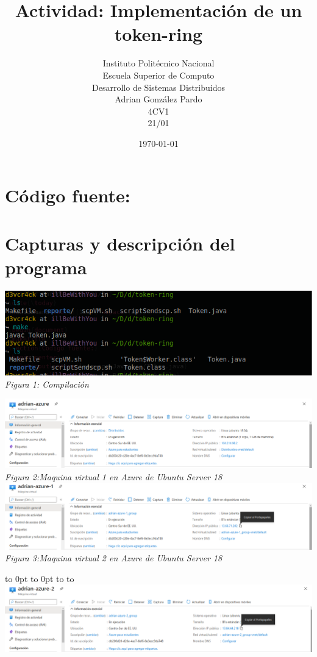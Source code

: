 \documentclass[10pt,executivepaper]{article}
\title{Actividad: Implementación de un token-ring}
\author{Instituto Politécnico Nacional\\Escuela Superior de Computo\\Desarrollo de Sistemas Distribuidos\\Adrian González Pardo\\4CV1\\21/01}
\date{\today}
\def\fillandplacepagenumber{%
 \par\pagestyle{empty}%
 \vbox to 0pt{\vss}\vfill
 \vbox to 0pt{\baselineskip0pt
   \hbox to\linewidth{\hss}%
   \baselineskip\footskip
   \hbox to\linewidth{%
     \hfil\thepage\hfil}\vss}}
\begin{document}
\maketitle
\section{Código fuente:}
\begin{center}
  
  
\end{center}
\section{Capturas y descripción del programa}
\begin{center}
  \includegraphics[scale=0.5]{img/compilacion.png}
  \\\textit{Figura 1: Compilación}
  \begin{landscape}
    \includegraphics[scale=0.5]{img/vm-1.png}
    \\\textit{Figura 2:Maquina virtual 1 en Azure de Ubuntu Server 18}\\
    \includegraphics[scale=0.5]{img/vm-2.png}
    \\\textit{Figura 3:Maquina virtual 2 en Azure de Ubuntu Server 18}\\
    \fillandplacepagenumber
    \includegraphics[scale=0.5]{img/vm-3.png}

\end{landscape}
\end{center}
\end{document}
